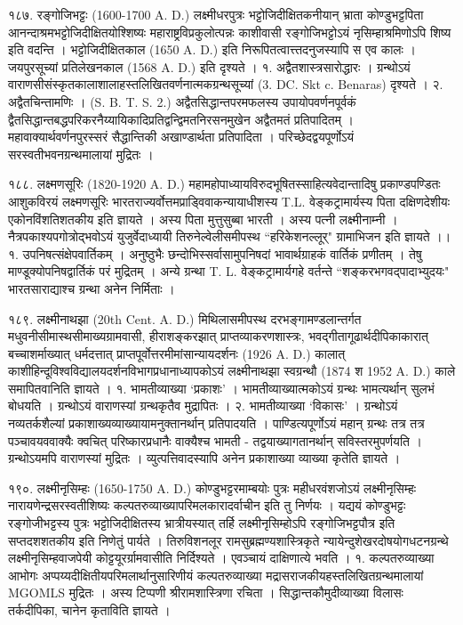 १८७. रङ्गोजिभट्टः (1600-1700 A. D.)
लक्ष्मीधरपुत्रः भट्टोजिदीक्षितकनीयान् भ्राता कोण्डुभट्टपिता आनन्दाश्रमभट्टोजिदीक्षितयोश्शिष्यः महाराष्ट्रविप्रकुलोत्पन्नः काशीवासी रङ्गोजिभट्टोऽयं नृसिम्हाश्रमिणोऽपि शिष्य इति वदन्ति । भट्टोजिदीक्षितकाल (1650 A. D.) इति निरूपितत्वात्त्तदनुजस्यापि स एव कालः । जयपुरसूच्यां प्रतिलेखनकाल (1568 A. D.) इति दृश्यते ।
१. अद्वैतशास्त्रसारोद्धारः । ग्रन्थोऽयं वाराणसीसंस्कृतकालाशालाहस्तलिखितवर्णनात्मकग्रन्थसूच्यां (3. DC. Skt c. Benaras) दृश्यते ।
२. अद्वैतचिन्तामणिः । (S. B. T. S. 2.)
अद्वैतसिद्धान्तपरमफलस्य उपायोपवर्णनपूर्वकं द्वैतसिद्धान्तबद्धपरिकरनैय्यायिकादिप्रतिद्वन्द्विमतनिरसनमुखेन अद्वैतमतं प्रतिपादितम् । महावाक्यार्थवर्णनपुरस्सरं सैद्धान्तिकी अखाण्डार्थता प्रतिपादिता । परिच्छेदद्वयपूर्णोऽयं सरस्वतीभवनग्रन्थमालायां मुद्रितः ।

१८८. लक्ष्मणसूरिः (1820-1920 A. D.)
महामहोपाध्यायविरुदभूषितस्साहित्यवेदान्तादिषु प्रकाण्डपण्डितः आशुकविरयं लक्ष्मणसूरिः भारतराज्यर्वोत्तमप्राड्विवाकन्यायाधीशस्य T.L. वेङ्कट्रामार्यस्य पिता दक्षिणदेशीयः एकोनविंशतिशतकीय इति ज्ञायते । अस्य पिता मुत्तुसुब्बा भारती । अस्य पत्नी लक्ष्मीनाम्नी । नैत्रपकाश्यपगोत्रोद्भवोऽयं युजुर्वेदाध्यायी तिरुनेल्वेलीसमीपस्थ ``हरिकेशनल्लूर्" ग्रामाभिजन इति ज्ञायते ।।
१. उपनिषत्संक्षेपवार्तिकम् । अनुष्ठुभैः छन्दोभिस्सर्वासामुपनिषदां भावार्थग्राहकं वार्तिकं प्रणीतम् । तेषु माण्डूक्योपनिषद्वार्तिकं परं मुद्रितम् । अन्ये ग्रन्था T. L. वेङ्कट्रामार्यगहे वर्तन्ते ``शङ्करभगवद्पादाभ्युदयः" भारतसाराद्याश्च ग्रन्था अनेन निर्मिताः ।

१८९. लक्ष्मीनाथझा (20th Cent. A. D.)
मिथिलासमीपस्थ दरभङ्गामण्डलान्तर्गत मधुवनीसीमास्थसीमाख्यग्रामवासी, हीराशङ्करझात् प्राप्तव्याकरणशास्त्रः, भवद्गीतागूढार्थदीपिकाकारात् बच्चाशर्माख्यात् धर्मदत्तात् प्राप्तपूर्वोत्तरमीमांसान्यायदर्शनः (1926 A. D.) कालात् काशीहिन्दूविश्वविद्यालयदर्शनविभागप्रधानाध्यापकोऽयं लक्ष्मीनाथझा स्वग्रन्थौ (1874 श 1952 A. D.) काले समापितवानिति ज्ञायते ।
१. भामतीव्याख्या `प्रकाशः' । भामतीव्याख्यात्मकोऽयं ग्रन्थः भामत्यर्थान् सुलभं बोधयति । ग्रन्थोऽयं वाराणस्यां ग्रन्थकृतैव मुद्रापितः ।
२. भामतीव्याख्या `विकासः' । ग्रन्थोऽयं नव्यतर्कशैल्यां प्रकाशाख्यव्याख्यायामनुक्तानर्थान् प्रतिपादयति । पाण्डित्यपूर्णोऽयं महान् ग्रन्थः तत्र तत्र पञ्चावयववाक्यैः क्वचित् परिष्कारप्रधानैः वाक्यैश्च भामती - तद्वयाख्यागतानर्थान् सविस्तरमुपर्णयति । ग्रन्थोऽयमपि वाराणस्यां मुद्रितः । व्युत्पत्तिवादस्यापि अनेन प्रकाशाख्या व्याख्या कृतेति ज्ञायते ।

१९०. लक्ष्मीनृसिम्हः (1650-1750 A. D.)
कोण्डुभट्टरमाम्बयोः पुत्रः महीधरवंशजोऽयं लक्ष्मीनृसिम्हः नारायणेन्द्रसरस्वतीशिष्यः कल्पतरुव्याख्यापरिमलकारादर्वाचीन इति तु निर्णयः । यद्ययं कोण्डुभट्टः रङ्गोजीभट्टस्य पुत्रः भट्टोजिदीक्षितस्य भ्रात्रीयस्यात् तर्हि लक्ष्मीनृसिम्होऽपि रङ्गोजिभट्टपौत्र इति सप्तदशशतकीय इति निणेतुं पार्यते । तिरुविशनलूर रामसुब्रह्मण्यशास्त्रिकृते न्यायेन्दुशेखरदोषयोगधटनग्रन्थे लक्ष्मीनृसिम्हवाजपेयी कोट्टयूरर्ग्रामवासीति निर्दिश्यते । एवञ्चायं दाक्षिणात्ये भवति ।
१. कल्पतरुव्याख्या आभोगः
अप्पय्यदीक्षितीयपरिमलार्थानुसारिणीयं कल्पतरुव्याख्या मद्रासराजकीयहस्तलिखितग्रन्थमालायां MGOMLS मुद्रितः । अस्य टिप्पणी श्रीरामशास्त्रिणा रचिता । सिद्धान्तकौमुदीव्याख्या विलासः तर्कदीपिका, चानेन कृताविति ज्ञायते ।

